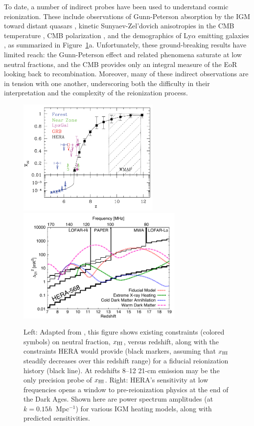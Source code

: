 \documentclass[preprint]{aastex}
\def\HI{{H{\small I }}}
\def\xHI{{x_{\rm\HI}}}
\begin{document}
To date, a number of indirect probes have been used to understand cosmic
reionization.  These include observations of Gunn-Peterson absorption by the
IGM toward distant quasars \citep{fan_et_al2006},
kinetic Sunyaev-Zel'dovich anisotropies in the CMB temperature \citep{zahn_et_al2012_trunc}, CMB
polarization \citep{page_et_al2007,planck_et_al2013}, and the
demographics of Ly$\alpha$ emitting galaxies
\citep{treu_et_al2013}, as summarized in Figure~\ref{fig:x_i_Xray}a.  Unfortunately,
these ground-breaking results have limited reach: the
Gunn-Peterson effect and related phenomena saturate at low neutral fractions,
and the CMB provides only an integral measure of %
the EoR looking 
back to recombination.  Moreover, many of these indirect observations are in
tension with one another, underscoring both the difficulty in their interpretation
and the complexity of the reionization process.


\begin{figure}[t]\centering
\includegraphics[height=2.25in]{plots/constraints.pdf}
\includegraphics[height=2.25in]{plots/Xray.pdf} 
\caption{\small 
Left: Adapted from \citet{robertson_2013}, this figure shows existing
constraints (colored symbols) on neutral fraction, $\xHI$, versus redshift, along with 
the constraints HERA would provide (black markers, assuming
that $\xHI$ steadily decreases over this redshift range) for a fiducial
reionization history (black line).
At redshifts 8--12
21-cm emission may be the only precision probe of $\xHI$.
Right: HERA's sensitivity at low frequencies opens a window to
pre-reionization physics at the end of the Dark Ages. Shown here are power spectrum amplitudes (at $k =
0.15h$~Mpc$^{-1}$) for various IGM heating models,
along with predicted sensitivities.
}\label{fig:x_i_Xray} \end{figure}
\end{document}
